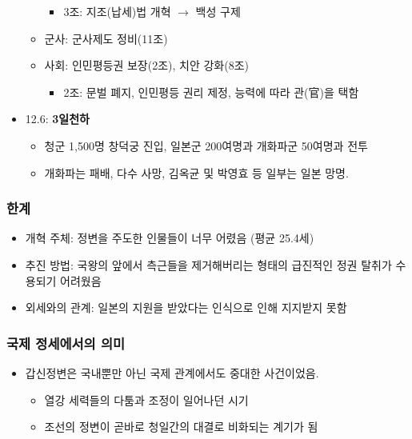 \begin{itemize}
\begin{itemize}
\begin{itemize}
            \item 3조: 지조(납세)법 개혁 $\rightarrow$ 백성 구제
        \end{itemize}
        \item 군사: 군사제도 정비(11조)
        \item 사회: 인민평등권 보장(2조), 치안 강화(8조)
        \begin{itemize}
            \item 2조: 문벌 폐지, 인민평등 권리 제정, 능력에 따라 관(官)을 택함
        \end{itemize}
    \end{itemize}
    \item 12.6: \textbf{3일천하}
    \begin{itemize}
        \item 청군 1,500명 창덕궁 진입, 일본군 200여명과 개화파군 50여명과 전투
        \item 개화파는 패배, 다수 사망, 김옥균 및 박영효 등 일부는 일본 망명.
    \end{itemize}
\end{itemize}

\subsubsection*{한계}
\begin{itemize}
    \item 개혁 주체: 정변을 주도한 인물들이 너무 어렸음 (평균 25.4세)
    \item 추진 방법: 국왕의 앞에서 측근들을 제거해버리는 형태의 급진적인 정권 탈취가 수용되기 어려웠음
    \item 외세와의 관계: 일본의 지원을 받았다는 인식으로 인해 지지받지 못함
\end{itemize}

\subsubsection*{국제 정세에서의 의미}
\begin{itemize}
    \item 갑신정변은 국내뿐만 아닌 국제 관계에서도 중대한 사건이었음.
    \begin{itemize}
        \item 열강 세력들의 다툼과 조정이 일어나던 시기
        \item 조선의 정변이 곧바로 청일간의 대결로 비화되는 계기가 됨
    \end{itemize}
\end{itemize}

